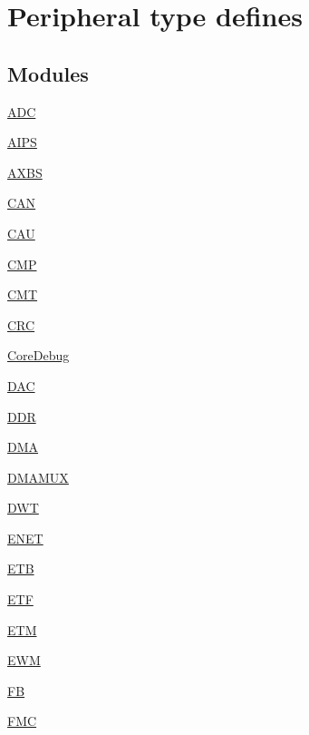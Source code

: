 \hypertarget{group___peripheral__defines}{}\section{Peripheral type defines}
\label{group___peripheral__defines}
\subsection*{Modules}
\begin{DoxyCompactItemize}
\item 
\hyperlink{group___a_d_c___peripheral}{A\+D\+C}
\item 
\hyperlink{group___a_i_p_s___peripheral}{A\+I\+P\+S}
\item 
\hyperlink{group___a_x_b_s___peripheral}{A\+X\+B\+S}
\item 
\hyperlink{group___c_a_n___peripheral}{C\+A\+N}
\item 
\hyperlink{group___c_a_u___peripheral}{C\+A\+U}
\item 
\hyperlink{group___c_m_p___peripheral}{C\+M\+P}
\item 
\hyperlink{group___c_m_t___peripheral}{C\+M\+T}
\item 
\hyperlink{group___c_r_c___peripheral}{C\+R\+C}
\item 
\hyperlink{group___core_debug___peripheral}{Core\+Debug}
\item 
\hyperlink{group___d_a_c___peripheral}{D\+A\+C}
\item 
\hyperlink{group___d_d_r___peripheral}{D\+D\+R}
\item 
\hyperlink{group___d_m_a___peripheral}{D\+M\+A}
\item 
\hyperlink{group___d_m_a_m_u_x___peripheral}{D\+M\+A\+M\+U\+X}
\item 
\hyperlink{group___d_w_t___peripheral}{D\+W\+T}
\item 
\hyperlink{group___e_n_e_t___peripheral}{E\+N\+E\+T}
\item 
\hyperlink{group___e_t_b___peripheral}{E\+T\+B}
\item 
\hyperlink{group___e_t_f___peripheral}{E\+T\+F}
\item 
\hyperlink{group___e_t_m___peripheral}{E\+T\+M}
\item 
\hyperlink{group___e_w_m___peripheral}{E\+W\+M}
\item 
\hyperlink{group___f_b___peripheral}{F\+B}
\item 
\hyperlink{group___f_m_c___peripheral}{F\+M\+C}

\end{DoxyCompactItemize}
